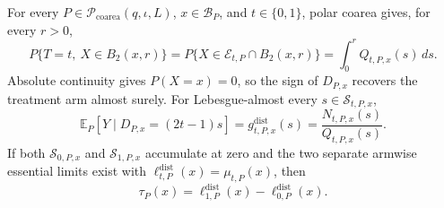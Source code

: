 For every \(P\in\mathcal P_{\mathrm{coarea}}(q,\iota,L)\),
\(x\in\mathcal B_P\), and \(t\in\{0,1\}\), polar coarea gives, for
every \(r>0\),
\[
 P\{T=t,\ X\in B_2(x,r)\}
 =P\{X\in\mathcal E_{t,P}\cap B_2(x,r)\}
 =\int_0^rQ_{t,P,x}(s)\,ds.
\]
Absolute continuity gives \(P(X=x)=0\), so the sign of \(D_{P,x}\)
recovers the treatment arm almost surely.  For Lebesgue-almost every
\(s\in\mathcal S_{t,P,x}\),
\[
 \mathbb E_P[Y\mid D_{P,x}=(2t-1)s]
 =g^{\mathrm{dist}}_{t,P,x}(s)
 =\frac{N_{t,P,x}(s)}{Q_{t,P,x}(s)}.
\]
If both \(\mathcal S_{0,P,x}\) and \(\mathcal S_{1,P,x}\) accumulate
at zero and the two separate armwise essential limits exist with
\(\ell^{\mathrm{dist}}_{t,P}(x)=\mu_{t,P}(x)\), then
\[
 \tau_P(x)=\ell^{\mathrm{dist}}_{1,P}(x)
 -\ell^{\mathrm{dist}}_{0,P}(x).
\]